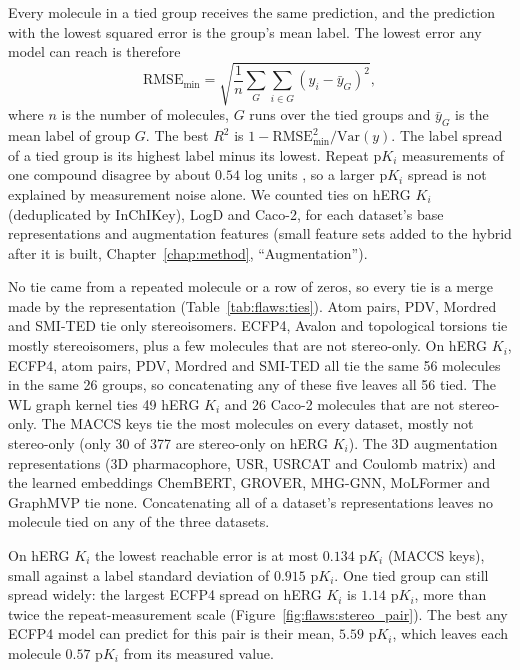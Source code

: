 Every molecule in a tied group receives the same prediction, and the prediction with the lowest squared error is the group's mean label. The lowest error any model can reach is therefore
\begin{equation}
\mathrm{RMSE}_{\min} = \sqrt{\frac{1}{n}\sum_{G}\sum_{i \in G}\left(y_i - \bar{y}_G\right)^2},
\end{equation}
where $n$ is the number of molecules, $G$ runs over the tied groups and $\bar{y}_G$ is the mean label of group $G$. The best $R^2$ is $1 - \mathrm{RMSE}_{\min}^2 / \mathrm{Var}(y)$. The label spread of a tied group is its highest label minus its lowest. Repeat p$K_i$ measurements of one compound disagree by about $0.54$ log units \citep{Kramer2012}, so a larger p$K_i$ spread is not explained by measurement noise alone. We counted ties on hERG $K_i$ (deduplicated by InChIKey), LogD and Caco-2, for each dataset's base representations and augmentation features (small feature sets added to the hybrid after it is built, Chapter~\ref{chap:method}, ``Augmentation'').

No tie came from a repeated molecule or a row of zeros, so every tie is a merge made by the representation (Table~\ref{tab:flaws:ties}). Atom pairs, PDV, Mordred and SMI-TED tie only stereoisomers. ECFP4, Avalon and topological torsions tie mostly stereoisomers, plus a few molecules that are not stereo-only. On hERG $K_i$, ECFP4, atom pairs, PDV, Mordred and SMI-TED all tie the same 56 molecules in the same 26 groups, so concatenating any of these five leaves all 56 tied. The WL graph kernel ties 49 hERG $K_i$ and 26 Caco-2 molecules that are not stereo-only. The MACCS keys tie the most molecules on every dataset, mostly not stereo-only (only 30 of 377 are stereo-only on hERG $K_i$). The 3D augmentation representations (3D pharmacophore, USR, USRCAT and Coulomb matrix) and the learned embeddings ChemBERT, GROVER, MHG-GNN, MoLFormer and GraphMVP tie none. %
Concatenating all of a dataset's representations leaves no molecule tied on any of the three datasets.

On hERG $K_i$ the lowest reachable error is at most $0.134$ p$K_i$ (MACCS keys), small against a label standard deviation of $0.915$ p$K_i$. One tied group can still spread widely: the largest ECFP4 spread on hERG $K_i$ is $1.14$ p$K_i$, more than twice the repeat-measurement scale (Figure~\ref{fig:flaws:stereo_pair}). The best any ECFP4 model can predict for this pair is their mean, $5.59$ p$K_i$, which leaves each molecule $0.57$ p$K_i$ from its measured value.

